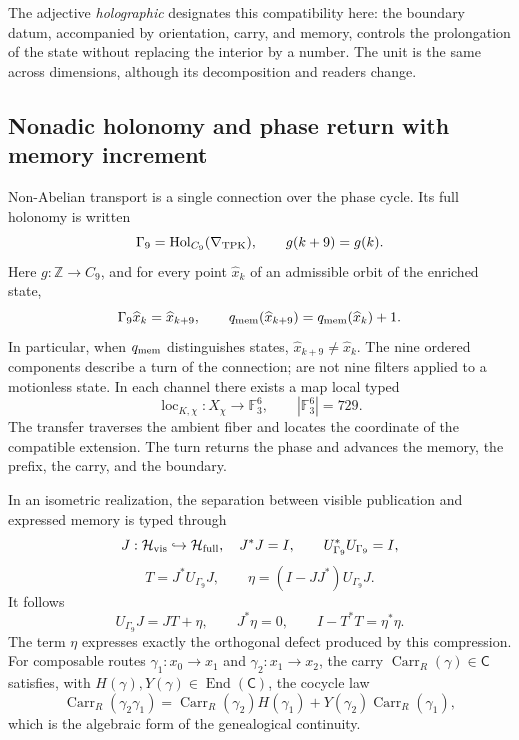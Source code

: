 The adjective \emph{holographic} designates this compatibility here: the
boundary datum, accompanied by orientation, carry, and memory, controls the
prolongation of the state without replacing the interior by a number. The unit is
the same across dimensions, although its decomposition and readers
change.

\subsection*{Nonadic holonomy and phase return with memory increment}

Non-Abelian transport is a single connection over the phase cycle. Its
full holonomy is written
\begin{equation}\label{p12-83-c0-s1:eq:horizonte-conexion-nonadica}
 \Gamma_9=\operatorname{Hol}_{C_9}(\nabla_{\rm TPK}),
 \qquad g(k+9)=g(k).
\end{equation}
Here \(g:\mathbb Z\to C_9\), and for every point
\(\widehat x_k\) of an admissible orbit of the enriched state,
\[
 \Gamma_9\widehat x_k=\widehat x_{k+9},\qquad
 q_{\rm mem}(\widehat x_{k+9})
 =q_{\rm mem}(\widehat x_k)+1.
\]
In particular, when \(q_{\rm mem}\) distinguishes states,
\(\widehat x_{k+9}\neq\widehat x_k\).
The nine ordered components describe a turn of the connection; are not
nine filters applied to a motionless state. In each channel there exists a map
local typed
\[
 \operatorname{loc}_{K,\chi}:X_\chi\longrightarrow\mathbb F_3^6,
 \qquad |\mathbb F_3^6|=729.
\]
The transfer traverses the ambient fiber and locates the coordinate of the
compatible extension. The turn returns the phase and advances the memory,
the prefix, the carry, and the boundary.

In an isometric realization, the separation between visible publication and expressed memory is typed through
\[
 J:\mathcal H_{\rm vis}\hookrightarrow\mathcal H_{\rm full},
 \quad J^*J=I,\qquad
 U_{\Gamma_9}^*U_{\Gamma_9}=I,
\]
\[
 T=J^*U_{\Gamma_9}J,\qquad
 \eta=(I-JJ^*)U_{\Gamma_9}J.
\]
It follows
\begin{equation}\label{p12-83-c0-s1:eq:horizonte-compresion-expresion}
 U_{\Gamma_9}J=JT+\eta,
 \qquad J^*\eta=0,
 \qquad I-T^*T=\eta^*\eta.
\end{equation}
The term \(\eta\) expresses exactly the orthogonal defect produced by
this compression. For composable routes
\(\gamma_1:x_0\to x_1\) and \(\gamma_2:x_1\to x_2\), the carry
\(\operatorname{Carr}_R(\gamma)\in\mathsf C\) satisfies, with
\(H(\gamma),Y(\gamma)\in\operatorname{End}(\mathsf C)\), the cocycle law
\begin{equation}\label{p12-83-c0-s1:eq:horizonte-carry-cociclico}
 \operatorname{Carr}_R(\gamma_2\gamma_1)
 =\operatorname{Carr}_R(\gamma_2)H(\gamma_1)
  +Y(\gamma_2)\operatorname{Carr}_R(\gamma_1),
\end{equation}
which is the algebraic form of the genealogical continuity.

